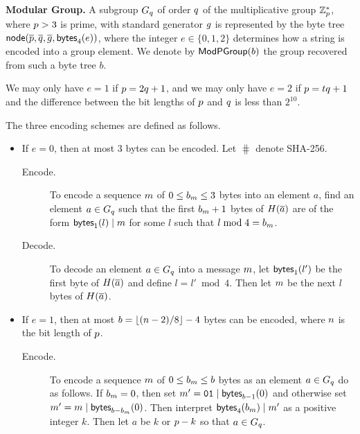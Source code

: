 \item\textbf{Modular Group.} A subgroup $G_{q}$ of order $q$ of the
  multiplicative group $\mathbb{Z}_{p}^*$, where $p>3$ is prime, with
  standard generator $g$ is represented by the byte tree
  $\textsf{node}(\overline{p},\overline{q},\overline{g},\textsf{bytes}_{4}(e))$, where the integer
  $e\in\{0,1,2\}$ determines how a string is encoded into a group
  element. We denote by $\textsf{ModPGroup}(b)$ the group recovered from such
  a byte tree $b$.

  We may only have $e=1$ if $p=2q+1$, and we may only have $e=2$ if
  $p=tq+1$ and the difference between the bit lengths of $p$ and
  $q$ is less than $2^{10}$.

  The three encoding schemes are defined as follows.
  \begin{itemize}

  \item If $e=0$, then at most 3 bytes can be encoded. Let $\hash$
    denote SHA-256.

    \begin{description}

    \item[Encode.] To encode a sequence $m$ of $0\leq
      b_{m}\leq3$ bytes into an element $a$, find an element
      $a\in G_{q}$ such that the first $b_{m}+1$ bytes of
      $H(\overline{a})$ are of the form $\textsf{bytes}_{1}(l)\mid m$ for
      some $l$ such that $l\bmod 4=b_{m}$.

    \item[Decode.] To decode an element $a\in G_{q}$ into a message
      $m$, let $\textsf{bytes}_{1}(l')$ be the first byte of
      $H(\overline{a})$ and define $l=l'\bmod4$. Then let $m$ be the
      next $l$ bytes of $H(\overline{a})$.

    \end{description}

  \item If $e=1$, then at most $b=\lfloor(n-2)/8\rfloor-4$ bytes
    can be encoded, where $n$ is the bit length of $p$.
    \begin{description}

    \item[Encode.] To encode a sequence $m$ of $0\leq
      b_{m}\leq b$ bytes as an element $a\in G_{q}$ do as follows.
      If $b_{m}=0$, then set $m'=\texttt{01}\mid\textsf{bytes}_{b-1}(0)$
      and otherwise set
      $m'=m\mid\textsf{bytes}_{b-b_{m}}(0)$. Then interpret
      $\textsf{bytes}_{4}(b_{m})\mid m'$ as a positive integer
      $k$. Then let $a$ be $k$ or $p-k$ so that $a\in G_{q}$.


\end{description}
\end{itemize}
